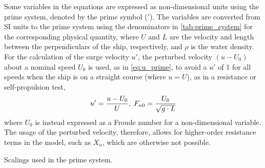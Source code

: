 \noindent Some variables in the equations are expressed as non-dimensional units using the prime system, denoted by the prime symbol ($'$). The variables are converted from SI units to the prime system using the denominators in \autoref{tab:prime_system} for the corresponding physical quantity, where $U$ and $L$ are the velocity and length between the perpendiculars of the ship, respectively, and $\rho$ is the water density.
For the calculation of the surge velocity $u'$, the perturbed velocity $(u-U_0)$ about a nominal speed $U_0$ is used, as in  \autoref{eq:u_prime}, to avoid a $u'$ of 1 for all speeds when the ship is on a straight course (where $u=U$), as in a resistance or self-propulsion test, 
\begin{equation}
    \label{eq:u_prime}
    u' = \frac{u-U_0}{U}, \hspace{0.1cm}
    F_{n0} = \frac{U_0}{\sqrt{g \cdot L}}
\end{equation}
where $U_0$ is instead expressed as a Froude number for a non-dimensional variable.
The usage of the perturbed velocity, therefore, allows for higher-order resistance terms in the model, such as $X_{u}$, which are otherwise not possible. 
\begin{table}[h]
    \caption{Scalings used in the prime system.}
    \label{tab:prime_system}
    \centering
\end{table}
